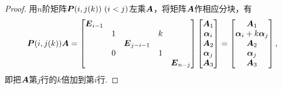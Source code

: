 \begin{property}
\begin{proof}
用\(n\)阶矩阵\(\boldsymbol{P}(i,j(k))\ (i < j)\)左乘\(\boldsymbol{A}\)，将矩阵\(\boldsymbol{A}\)作相应分块，有\begin{equation*}
	\boldsymbol{P}(i,j(k)) \boldsymbol{A} = \begin{bmatrix}
		\boldsymbol{E}_{i-1} \\
		& 1 & & k \\
		& & \boldsymbol{E}_{j-i-1} \\
		& 0 & & 1 \\
		& & & & \boldsymbol{E}_{n-j}
	\end{bmatrix}
	\begin{bmatrix}
		\boldsymbol{A}_1 \\ \boldsymbol\alpha_i \\ \boldsymbol{A}_2 \\ \boldsymbol\alpha_j \\ \boldsymbol{A}_3
	\end{bmatrix}
	= \begin{bmatrix}
		\boldsymbol{A}_1 \\ \boldsymbol\alpha_i + k \boldsymbol\alpha_j \\ \boldsymbol{A}_2 \\ \boldsymbol\alpha_j \\ \boldsymbol{A}_3
	\end{bmatrix},
\end{equation*}
即把\(\boldsymbol{A}\)第\(j\)行的\(k\)倍加到第\(i\)行.
\end{proof}
\end{property}
